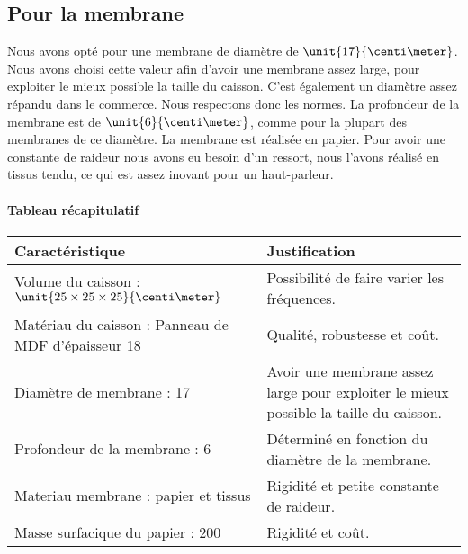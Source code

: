 \subsection{Pour la membrane}
Nous avons opté pour une membrane de diamètre de $\unit{17}{\centi\meter}$. Nous avons choisi cette valeur afin 
d'avoir une membrane assez large, pour exploiter le mieux possible la taille du caisson. C'est également un
diamètre assez répandu dans le commerce\cite{tlhp}. Nous respectons donc les normes.
La profondeur de la membrane est de $\unit{6}{\centi\meter}$, comme pour la plupart des membranes de ce
diamètre\cite{tlhp}. La membrane est réalisée en papier. Pour avoir une constante de raideur nous avons eu besoin
d'un ressort, nous l'avons réalisé en tissus tendu, ce qui est assez inovant pour un haut-parleur.

\paragraph{Tableau récapitulatif}

\begin{table}
	\centering
	\begin{tabularx}{\textwidth}{|X|X|}
		\hline
			 \textbf{Caractéristique} & \textbf{Justification} \\
		\hline
			Volume du caisson : $\unit{25\times25\times25}{\centi\meter}$ & Possibilité de faire varier les fréquences.  \\
		\hline
			Matériau du caisson : Panneau de 	MDF
			d'épaisseur \unit{18}{\milli\meter} & Qualité, robustesse et coût. \\
		\hline
			Diamètre de membrane : \unit{17}{\centi\meter} & Avoir une membrane assez large pour exploiter le mieux possible la taille du caisson. \\
		\hline
			Profondeur de la membrane : \unit{6}{\centi\meter} & Déterminé en fonction du diamètre de la membrane. \\
		\hline
			Materiau membrane : papier et tissus & Rigidité et petite constante de raideur. \\
		\hline
			Masse surfacique du papier : \unit{200}{\gram\per\meter\squared} & Rigidité et coût. \\
		\hline
	\end{tabularx}
\end{table}


